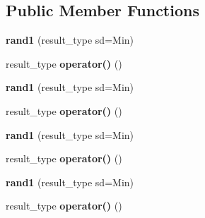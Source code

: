 \subsection*{Public Member Functions}
\begin{DoxyCompactItemize}
\item 
\mbox{\label{classrand1_a4a66a4aa117b08ec6650407b8fb8be0e}} 
{\bfseries rand1} (result\+\_\+type sd=Min)
\item 
\mbox{\label{classrand1_a3764db52ec00e620a0eb80c73a18b066}} 
result\+\_\+type {\bfseries operator()} ()
\item 
\mbox{\label{classrand1_a4a66a4aa117b08ec6650407b8fb8be0e}} 
{\bfseries rand1} (result\+\_\+type sd=Min)
\item 
\mbox{\label{classrand1_a3764db52ec00e620a0eb80c73a18b066}} 
result\+\_\+type {\bfseries operator()} ()
\item 
\mbox{\label{classrand1_a4a66a4aa117b08ec6650407b8fb8be0e}} 
{\bfseries rand1} (result\+\_\+type sd=Min)
\item 
\mbox{\label{classrand1_a3764db52ec00e620a0eb80c73a18b066}} 
result\+\_\+type {\bfseries operator()} ()
\item 
\mbox{\label{classrand1_a4a66a4aa117b08ec6650407b8fb8be0e}} 
{\bfseries rand1} (result\+\_\+type sd=Min)
\item 
\mbox{\label{classrand1_a3764db52ec00e620a0eb80c73a18b066}} 
result\+\_\+type {\bfseries operator()} ()
\end{DoxyCompactItemize}
